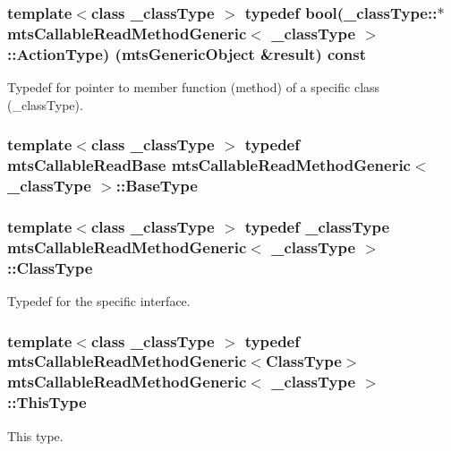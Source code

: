 \subsubsection[{Action\+Type}]{\setlength{\rightskip}{0pt plus 5cm}template$<$class \+\_\+class\+Type $>$ typedef bool(\+\_\+class\+Type\+::$\ast$ {\bf mts\+Callable\+Read\+Method\+Generic}$<$ \+\_\+class\+Type $>$\+::Action\+Type) ({\bf mts\+Generic\+Object} \&result) const }\label{classmts_callable_read_method_generic_a0f8662a2b477512a0cfa147cc8faa555}
Typedef for pointer to member function (method) of a specific class (\+\_\+class\+Type). \hypertarget{classmts_callable_read_method_generic_ade696274218351d03e90dd1d7609d575}{}
\subsubsection[{Base\+Type}]{\setlength{\rightskip}{0pt plus 5cm}template$<$class \+\_\+class\+Type $>$ typedef {\bf mts\+Callable\+Read\+Base} {\bf mts\+Callable\+Read\+Method\+Generic}$<$ \+\_\+class\+Type $>$\+::{\bf Base\+Type}}\label{classmts_callable_read_method_generic_ade696274218351d03e90dd1d7609d575}
\hypertarget{classmts_callable_read_method_generic_afa0ef401d0f5538af2f0fe114ad9202d}{}
\subsubsection[{Class\+Type}]{\setlength{\rightskip}{0pt plus 5cm}template$<$class \+\_\+class\+Type $>$ typedef \+\_\+class\+Type {\bf mts\+Callable\+Read\+Method\+Generic}$<$ \+\_\+class\+Type $>$\+::{\bf Class\+Type}}\label{classmts_callable_read_method_generic_afa0ef401d0f5538af2f0fe114ad9202d}
Typedef for the specific interface. \hypertarget{classmts_callable_read_method_generic_a4fa11906c9156401ae37307545a10f80}{}
\subsubsection[{This\+Type}]{\setlength{\rightskip}{0pt plus 5cm}template$<$class \+\_\+class\+Type $>$ typedef {\bf mts\+Callable\+Read\+Method\+Generic}$<${\bf Class\+Type}$>$ {\bf mts\+Callable\+Read\+Method\+Generic}$<$ \+\_\+class\+Type $>$\+::{\bf This\+Type}}\label{classmts_callable_read_method_generic_a4fa11906c9156401ae37307545a10f80}
This type. 

